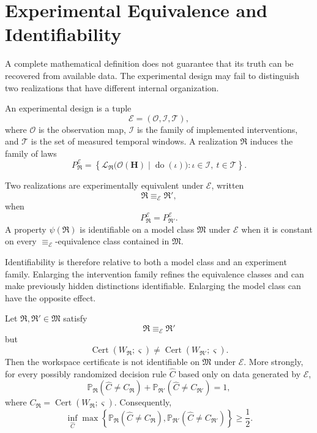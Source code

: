 \section{Experimental Equivalence and Identifiability}

A complete mathematical definition does not guarantee that its truth can be
recovered from available data. The experimental design may fail to distinguish
two realizations that have different internal organization.

\begin{SRWTdefinition}
\label{SRWT:def:workspace-experiment-design}
An experimental design is a tuple
\[
\mathcal E
=
(\mathcal O,\mathcal I,\mathcal T),
\]
where \(\mathcal O\) is the observation map, \(\mathcal I\) is the family of
implemented interventions, and \(\mathcal T\) is the set of measured temporal
windows. A realization \(\mathfrak R\) induces the family of laws
\[
P_{\mathfrak R}^{\mathcal E}
=
\left
\{
\mathcal L_{\mathfrak R}
\bigl(\mathcal O(\mathbf H)\mid\operatorname{do}(\iota)\bigr):
\iota\in\mathcal I,
\ t\in\mathcal T
\right\}.
\]
\end{SRWTdefinition}

\begin{SRWTdefinition}
Two realizations are experimentally equivalent under \(\mathcal E\), written
\[
\mathfrak R\equiv_{\mathcal E}\mathfrak R',
\]
when
\[
P_{\mathfrak R}^{\mathcal E}
=
P_{\mathfrak R'}^{\mathcal E}.
\]
A property \(\psi(\mathfrak R)\) is identifiable on a model class
\(\mathfrak M\) under \(\mathcal E\) when it is constant on every
\(\equiv_{\mathcal E}\)-equivalence class contained in \(\mathfrak M\).
\end{SRWTdefinition}

Identifiability is therefore relative to both a model class and an experiment
family. Enlarging the intervention family refines the equivalence classes and
can make previously hidden distinctions identifiable. Enlarging the model
class can have the opposite effect.


\begin{SRWTtheorem}
\label{SRWT:thm:workspace-nonidentifiability}
Let \(\mathfrak R,\mathfrak R'\in\mathfrak M\) satisfy
\[
\mathfrak R\equiv_{\mathcal E}\mathfrak R'
\]
but
\[
\operatorname{Cert}(W_{\mathfrak R};\varsigma)
\neq
\operatorname{Cert}(W_{\mathfrak R'};\varsigma).
\]
Then the workspace certificate is not identifiable on \(\mathfrak M\) under
\(\mathcal E\). More strongly, for every possibly randomized decision rule
\(\widehat C\) based only on data generated by \(\mathcal E\),
\[
\boxed{
\mathbb P_{\mathfrak R}
\left(
\widehat C\neq C_{\mathfrak R}
\right)
+
\mathbb P_{\mathfrak R'}
\left(
\widehat C\neq C_{\mathfrak R'}
\right)
=1,
}
\]
where \(C_{\mathfrak R}=\operatorname{Cert}(W_{\mathfrak R};\varsigma)\).
Consequently,
\[
\inf_{\widehat C}
\max\left\{
\mathbb P_{\mathfrak R}(\widehat C\neq C_{\mathfrak R}),
\mathbb P_{\mathfrak R'}(\widehat C\neq C_{\mathfrak R'})
\right\}
\geq\frac12.
\]
\end{SRWTtheorem}

